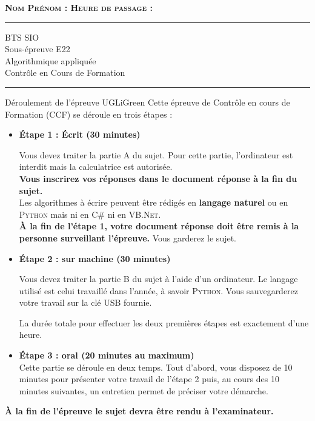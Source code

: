 \documentclass[a4paper,12pt,exos,firamath]{nsi}
\begin{document}
{\large\bfseries \scshape Nom Prénom : \makebox[6cm]{\dotfill}\hfill Heure de passage : \makebox[3cm]{\dotfill}\hfill\\
\vspace{2em}
\hrule
\vspace{2mm}
\begin{center}\titlefont\Huge\color{UGLiBlue} BTS SIO\\
	Sous-épreuve E22 \\ 
    Algorithmique appliquée\\
	Contrôle en Cours de Formation\end{center}
\vspace{2mm}
\hrule}
\vspace{2em}

\begin{encadrecolore}{Déroulement de l'épreuve }{UGLiGreen}
	Cette épreuve de Contrôle en cours de Formation (CCF) se déroule en trois étapes :
\begin{itemize}
	\item \textbf{\'Etape 1 : \'Ecrit (30 minutes)}\par
	Vous devez traiter la partie A du sujet. Pour cette partie, l'ordinateur est interdit mais la calculatrice est autorisée.\\
    
    \textbf{Vous inscrirez vos réponses dans le document réponse à la fin du sujet.}\\
    
    Les algorithmes à écrire peuvent être rédigés en \textbf{langage naturel} ou en \textsc{Python}	mais ni en \textsc{C\#} ni en \textsc{VB.Net}.\\
    
    \textbf{À la fin de l'étape 1, votre document réponse doit être remis à la personne surveillant l'épreuve.} Vous garderez le sujet.
    \item \textbf{\'Etape 2 : sur machine (30 minutes)}\par
	Vous devez traiter la partie B du sujet à l'aide d'un ordinateur. Le langage utilisé est celui travaillé dans l'année, à savoir \textsc{Python}.
	Vous sauvegarderez votre travail sur la clé USB fournie.\par 
	La durée totale pour effectuer les deux premières étapes est exactement d'une heure. \par
	\item \textbf{\'Etape 3 : oral (20 minutes au maximum)}\\
	Cette partie se déroule en deux temps. Tout d'abord, vous disposez de 10 minutes pour présenter votre travail de l'étape 2 puis, au cours des 10 minutes suivantes, un entretien permet de préciser votre démarche.
\end{itemize}	

\textbf{À la fin de l'épreuve le sujet devra être rendu à l'examinateur.}
\end{encadrecolore}
\newpage
\end{document}
